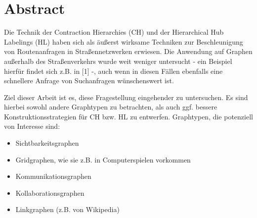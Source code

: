 \chapter{Abstract}
Die Technik der Contraction Hierarchies (CH) und der Hierarchical Hub Labelings (HL) haben sich als äußerst wirksame Techniken zur Beschleunigung von Routenanfragen in Straßennetzwerken erwiesen. Die Anwendung auf Graphen außerhalb des Straßenverkehrs wurde weit weniger untersucht - ein Beispiel hierfür findet sich z.B. in [1] -, auch wenn in diesen Fällen ebenfalls eine schnellere Anfrage von Suchanfragen wünschenswert ist.

Ziel dieser Arbeit ist es, diese Fragestellung eingehender zu untersuchen. Es sind hierbei sowohl andere Graphtypen zu betrachten, als auch ggf. bessere Konstruktionsstrategien für CH bzw. HL zu entwerfen. Graphtypen, die potenziell von Interesse sind:

\begin{itemize}
      \item
            Sichtbarkeitsgraphen
      \item
            Gridgraphen, wie sie z.B. in Computerspielen vorkommen
      \item
            Kommunikationsgraphen
      \item
            Kollaborationsgraphen
      \item
            Linkgraphen (z.B. von Wikipedia)
\end{itemize}
